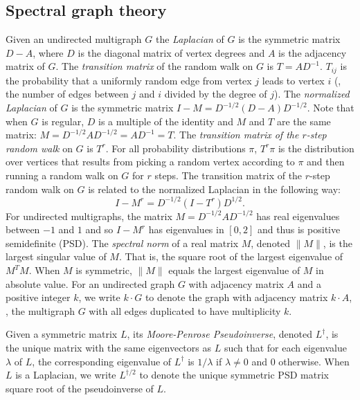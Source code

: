 \documentclass{toc}
\numberwithin{myalgctr}{section}
\theoremstyle{named}
\begin{document}
\subsection{Spectral graph theory}   
Given an undirected multigraph $G$ the \emph{Laplacian} of $G$ is the symmetric matrix $D-A$, where $D$ is the diagonal matrix of vertex degrees and $A$ is the adjacency matrix of $G$. The \emph{transition matrix} of the random walk on $G$ is $T=AD^{-1}$. $T_{ij}$ is the probability that a uniformly random edge from vertex $j$ leads to vertex $i$ (\ie, the number of edges between $j$ and $i$ divided by the degree of $j$). The \emph{normalized Laplacian} of $G$ is the symmetric matrix $I-M=D^{-1/2}(D-A)D^{-1/2}$. Note that when $G$ is regular, $D$ is a multiple of the identity and $M$ and $T$ are the same matrix: $M=D^{-1/2}AD^{-1/2}=AD^{-1}=T$. The \emph{transition matrix of the $r$-step random walk} on $G$ is $T^r$. For all probability distributions $\pi$, $T^r\pi$ is the distribution over vertices that results from picking a random vertex according to $\pi$ and then running a random walk on $G$ for $r$ steps. The transition matrix of the $r$-step random walk on $G$ is related to the normalized Laplacian in the following way:
\[
I-M^r = D^{-1/2}(I-T^r)D^{1/2}.
\]
For undirected multigraphs, the matrix $M=D^{-1/2}AD^{-1/2}$ has real eigenvalues between $-1$ and $1$ and so $I-M^r$ has eigenvalues in $[0,2]$ and thus is positive semidefinite (PSD). The \emph{spectral norm} of a real matrix $M$, denoted $\|M\|$, is the largest singular value of $M$. That is, the square root of the largest eigenvalue of $M^TM$. When $M$ is symmetric, $\|M\|$ equals the largest eigenvalue of $M$ in absolute value. For an undirected graph $G$ with adjacency matrix $A$ and a positive
integer $k$, we write $k\cdot G$ to denote the graph with adjacency matrix $k\cdot A$, \ie, the multigraph $G$ with all edges duplicated to have multiplicity $k$. 

Given a symmetric matrix $L$, its \emph{Moore-Penrose Pseudoinverse}, denoted $L^{\dagger}$, is the unique matrix with the same eigenvectors as $L$ such that for each eigenvalue $\lambda$ of $L$, the corresponding eigenvalue of $L^{\dagger}$ is $1/\lambda$ if $\lambda\neq 0$ and 0 otherwise. When $L$ is a Laplacian, we write $L^{\dagger/2}$ to denote the unique symmetric PSD matrix square root of the pseudoinverse of $L$. 
\end{document}
